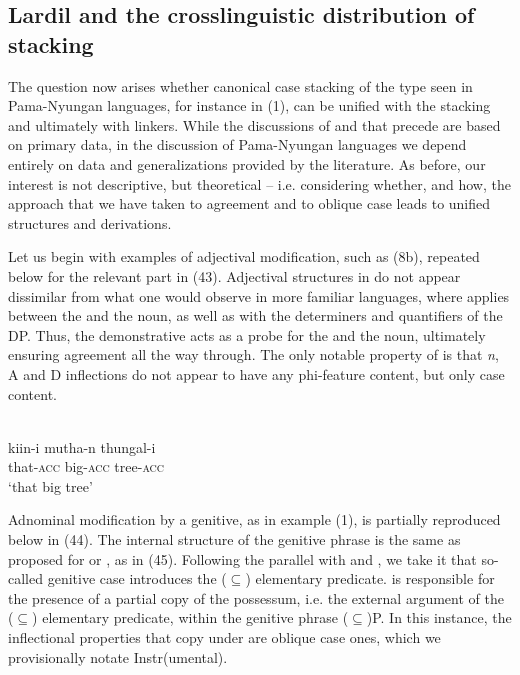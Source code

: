 \documentclass[output=paper]{langsci/langscibook}
\begin{document}
\subsection{Lardil and the crosslinguistic distribution of stacking}%

The question now arises whether canonical case stacking of the type seen in Pama-Nyungan languages, for instance  in (1), can be unified with the  stacking and ultimately with  linkers. While the discussions of  and  that precede are based on primary data, in the discussion of Pama-Nyungan languages we depend entirely on data and generalizations provided by the literature. As before, our interest is not descriptive, but theoretical – i.e. considering whether, and how, the approach that we have taken to agreement and to oblique case leads to unified structures and derivations.

  Let us begin with examples of adjectival modification, such as (8b), repeated below for the relevant part in (43). Adjectival structures in  do not appear dissimilar from what one would observe in more familiar languages, where  applies between the  and the noun, as well as with the determiners and quantifiers of the DP. Thus, the demonstrative acts as a probe for the  and the noun, ultimately ensuring agreement all the way through. The only notable property of  is that \textit{n}, A and D inflections do not appear to have any phi-feature content, but only case content.

\ea%
         \label{ex:manzini:43}\\
    \gll kiin-i     mutha-n   thungal-i \\
         that-\textsc{acc}   big-\textsc{acc}     tree-\textsc{acc}     \\
    \glt ‘that big tree’
    \z
    
Adnominal modification by a genitive, as in example (1), is partially reproduced below in (44). The internal structure of the genitive phrase is the same as proposed for  or , as in (45). Following the parallel with  and , we take it that so-called genitive case introduces the ($\subseteq$) elementary predicate.  is responsible for the presence of a partial copy of the possessum, i.e. the external argument of the ($\subseteq$) elementary predicate, within the genitive phrase ($\subseteq$)P. In this instance, the inflectional properties that copy under  are oblique case ones, which we provisionally notate Instr(umental).  
\end{document}

